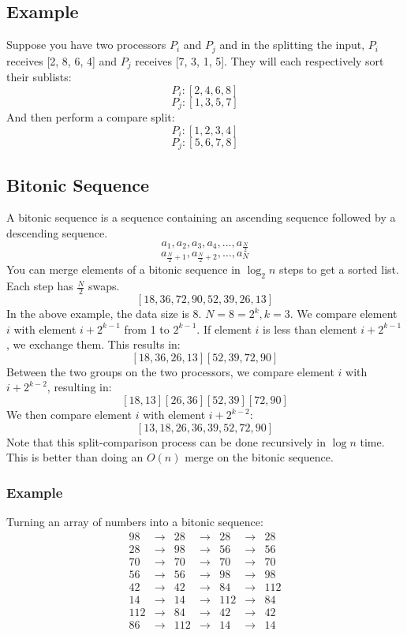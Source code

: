 \documentclass{math}
\begin{document}
\subsection*{Example}
Suppose you have two processors \( P_i \) and \( P_j \) and in the splitting
the input, \( P_i \) receives [2, 8, 6, 4] and \( P_j \) receives [7, 3, 1, 5].
They will each respectively sort their sublists:
\[ P_i: [2, 4, 6, 8] \]
\[ P_j: [1, 3, 5, 7] \]
And then perform a compare split:
\[ P_i: [1, 2, 3, 4] \]
\[ P_j: [5, 6, 7, 8] \]

\subsection*{Bitonic Sequence}
A bitonic sequence is a sequence containing an ascending sequence followed by a
descending sequence.
\[ a_1,a_2,a_3,a_4,\dots,a_{\frac{N}{2}} \]
\[ a_{\frac{N}{2}+1},a_{\frac{N}{2}+2},\dots,a_{N} \]
You can merge elements of a bitonic sequence in \( \log_2 n \) steps to get a
sorted list. Each step has \( \frac{N}{2} \) swaps.
\[ [18,36,72,90,52,39,26,13] \]
In the above example, the data size is 8. \( N = 8 = 2^k, k = 3 \). We compare
element \( i \) with element \( i+2^{k-1} \) from 1 to \( 2^{k-1} \).
If element \( i \) is less than element \( i+2^{k-1} \), we exchange them.
This results in:
\[ [18,36,26,13] [52,39,72,90] \]
Between the two groups on the two processors, we compare element \( i \) with
\( i+2^{k-2} \), resulting in:
\[ [18,13] [26,36] [52,39] [72,90] \]
We then compare element \( i \) with element \(i+2^{k-2} \):
\[ [13,18,26,36,39,52,72,90] \]
Note that this split-comparison process can be done recursively in \( \log n \)
time. This is better than doing an \( O(n) \) merge on the bitonic sequence.

\subsubsection*{Example}
Turning an array of numbers into a bitonic sequence:
\[ \begin{array}{lclclcl}
  98  & \to & 28  & \to & 28  & \to & 28  \\
  28  & \to & 98  & \to & 56  & \to & 56  \\
  70  & \to & 70  & \to & 70  & \to & 70  \\
  56  & \to & 56  & \to & 98  & \to & 98  \\
  42  & \to & 42  & \to & 84  & \to & 112 \\
  14  & \to & 14  & \to & 112 & \to & 84  \\
  112 & \to & 84  & \to & 42  & \to & 42  \\
  86  & \to & 112 & \to & 14  & \to & 14  \\
\end{array} \]
\end{document}

